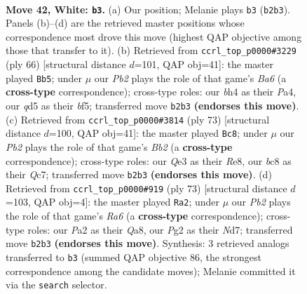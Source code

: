 \documentclass[11pt]{article}
\begin{document}
\clearpage

\begin{figure}[p]\centering
\begin{subfigure}{0.46\textwidth}\centering
\resizebox{\linewidth}{!}{%
\newchessgame
\chessboard[
  setfen={r1b4k/ppp2pp1/5n2/3q3p/1B3P1b/4Q2P/PPB3P1/R5K1 w - - 1 42},
  showmover=false,
  pgfstyle=straightmove, color=movearrow, markmove={b2-b3}
]}
\caption{}
\end{subfigure}\hfill
\begin{subfigure}{0.46\textwidth}\centering
\resizebox{\linewidth}{!}{%
\newchessgame
\chessboard[
  setfen={4R3/p1r2ppk/Bp1q3p/5b2/P2P4/2P4P/3Q2P1/6K1 w - - 6 34},
  showmover=false,
  pgfstyle=straightmove, color=movearrow, markmove={a6-b5}
]}
\caption{}
\end{subfigure}
\\[4pt]
\begin{subfigure}{0.46\textwidth}\centering
\resizebox{\linewidth}{!}{%
\newchessgame
\chessboard[
  setfen={4r1k1/1bq4p/4Ppp1/p1p5/P1P4P/1P2Q1P1/1KB1R3/8 b - - 0 37},
  showmover=false,
  pgfstyle=straightmove, color=movearrow, markmove={b7-c8}
]}
\caption{}
\end{subfigure}\hfill
\begin{subfigure}{0.46\textwidth}\centering
\resizebox{\linewidth}{!}{%
\newchessgame
\chessboard[
  setfen={q5k1/3n1ppb/3bp2p/3p4/6P1/r1BP1N1P/1Q2PPB1/3R2K1 b - - 1 37},
  showmover=false,
  pgfstyle=straightmove, color=movearrow, markmove={a3-a2}
]}
\caption{}
\end{subfigure}
\caption{\textbf{Move 42, White: \texttt{b3}.} (a) Our position; Melanie plays \texttt{b3} (\texttt{b2b3}). Panels (b)--(d) are the retrieved master positions whose correspondence most drove this move (highest QAP objective among those that transfer to it). (b) Retrieved from \texttt{ccrl\_top\_p0000\#3229} (ply 66) [structural distance $d$=101, QAP obj=41]: the master played \texttt{Bb5}; under $\mu$ our \emph{Pb2} plays the role of that game's \emph{Ba6} (a \textbf{cross-type} correspondence); cross-type roles: our \emph{b}h4 as their \emph{P}a4, our \emph{q}d5 as their \emph{b}f5; transferred move \texttt{b2b3} \textbf{(endorses this move)}. (c) Retrieved from \texttt{ccrl\_top\_p0000\#3814} (ply 73) [structural distance $d$=100, QAP obj=41]: the master played \texttt{Bc8}; under $\mu$ our \emph{Pb2} plays the role of that game's \emph{Bb2} (a \textbf{cross-type} correspondence); cross-type roles: our \emph{Q}e3 as their \emph{R}e8, our \emph{b}c8 as their \emph{Q}c7; transferred move \texttt{b2b3} \textbf{(endorses this move)}. (d) Retrieved from \texttt{ccrl\_top\_p0000\#919} (ply 73) [structural distance $d$=103, QAP obj=4]: the master played \texttt{Ra2}; under $\mu$ our \emph{Pb2} plays the role of that game's \emph{Ra6} (a \textbf{cross-type} correspondence); cross-type roles: our \emph{P}a2 as their \emph{Q}a8, our \emph{P}g2 as their \emph{N}d7; transferred move \texttt{b2b3} \textbf{(endorses this move)}. Synthesis: 3 retrieved analogs transferred to \texttt{b3} (summed QAP objective 86, the strongest correspondence among the candidate moves); Melanie committed it via the \texttt{search} selector.}
\label{fig:thought-m82}
\end{figure}
\end{document}
